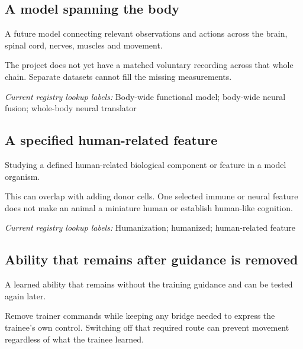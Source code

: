 \begin{samepage}
\subsection*{A model spanning the body}
\noindent A future model connecting relevant observations and actions across the brain, spinal cord, nerves, muscles and movement.\par
\end{samepage}
\begin{samepage}
\noindent The project does not yet have a matched voluntary recording across that whole chain. Separate datasets cannot fill the missing measurements.\par\nopagebreak[4]

\end{samepage}


\noindent\textit{Current registry lookup labels:} Body-wide functional model; body-wide neural fusion; whole-body neural translator\par

\begin{samepage}
\subsection*{A specified human-related feature}
\noindent Studying a defined human-related biological component or feature in a model organism.\par
\end{samepage}
\begin{samepage}
\noindent This can overlap with adding donor cells. One selected immune or neural feature does not make an animal a miniature human or establish human-like cognition.\par\nopagebreak[4]

\end{samepage}


\noindent\textit{Current registry lookup labels:} Humanization; humanized; human-related feature\par

\subsection*{Ability that remains after guidance is removed}
\noindent A learned ability that remains without the training guidance and can be tested again later.\par
\noindent Remove trainer commands while keeping any bridge needed to express the trainee’s own control. Switching off that required route can prevent movement regardless of what the trainee learned.\par

